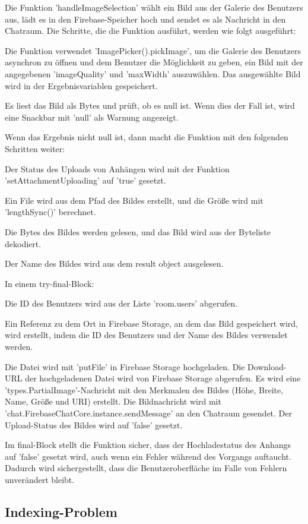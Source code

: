 Die Funktion 'handleImageSelection' wählt ein Bild aus der Galerie des Benutzers aus, lädt es in den Firebase-Speicher hoch und sendet es als Nachricht in den Chatraum. Die Schritte, die die Funktion ausführt, werden wie folgt ausgeführt:

Die Funktion verwendet 'ImagePicker().pickImage', um die Galerie des Benutzers asynchron zu öffnen und dem Benutzer die Möglichkeit zu geben, ein Bild mit der angegebenen 'imageQuality' und 'maxWidth' auszuwählen. Das ausgewählte Bild wird in der Ergebnisvariablen gespeichert.

Es liest das Bild als Bytes und prüft, ob es null ist. Wenn dies der Fall ist, wird eine Snackbar mit 'null' als Warnung angezeigt.

Wenn das Ergebnis nicht null ist, dann macht die Funktion mit den folgenden Schritten weiter:

Der Status des Uploads von Anhängen wird mit der Funktion 'setAttachmentUploading' auf 'true' gesetzt.

Ein File wird aus dem Pfad des Bildes erstellt, und die Größe wird mit 'lengthSync()' berechnet.

Die Bytes des Bildes werden gelesen, und das Bild wird aus der Byteliste dekodiert.

Der Name des Bildes wird aus dem result object ausgelesen.



In einem try-final-Block:

Die ID des Benutzers wird aus der Liste 'room.users' abgerufen.

Ein Referenz zu dem Ort in Firebase Storage, an dem das Bild gespeichert wird, wird erstellt, indem die ID des Benutzers und der Name des Bildes verwendet werden.

Die Datei wird mit 'putFile' in Firebase Storage hochgeladen.
Die Download-URL der hochgeladenen Datei wird von Firebase Storage abgerufen.
Es wird eine 'types.PartialImage'-Nachricht mit den Merkmalen des Bildes (Höhe, Breite, Name, Größe und URI) erstellt.
Die Bildnachricht wird mit 'chat.FirebaseChatCore.instance.sendMessage' an den Chatraum gesendet.
Der Upload-Status des Bildes wird auf 'false' gesetzt.

Im final-Block stellt die Funktion sicher, dass der Hochladestatus des Anhangs auf 'false' gesetzt wird, auch wenn ein Fehler während des Vorgangs auftaucht. Dadurch wird sichergestellt, dass die Benutzeroberfläche im Falle von Fehlern unverändert bleibt.

\subsection{Indexing-Problem}

